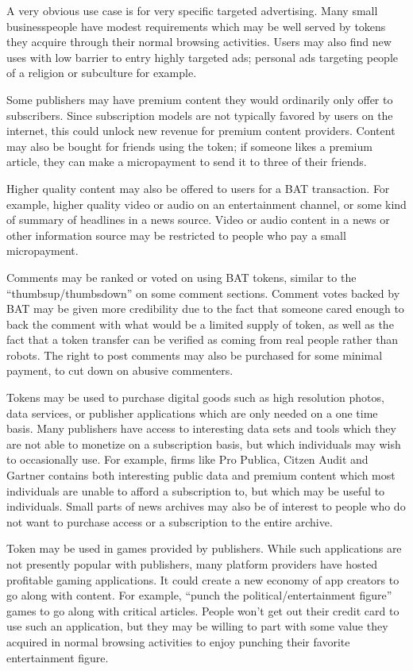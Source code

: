 \documentclass[11pt]{article}
\begin{document}
A very obvious use case is for very specific targeted advertising. Many small businesspeople have modest requirements which may be well served by tokens they acquire through their normal browsing activities. Users may also find new uses with low barrier to entry highly targeted ads; personal ads targeting people of a religion or subculture for example.

Some publishers may have premium content they would ordinarily only offer to subscribers. Since subscription models are not typically favored by users on the internet, this could unlock new revenue for premium content providers. Content may also be bought for friends using the token; if someone likes a premium article, they can make a micropayment to send it to three of their friends.

Higher quality content may also be offered to users for a BAT transaction. For example, higher quality video or audio on an entertainment channel, or some kind of summary of headlines in a news source. Video or audio content in a news or other information source may be restricted to people who pay a small micropayment.

Comments may be ranked or voted on using BAT tokens, similar to the “thumbsup/thumbsdown” on some comment sections. Comment votes backed by BAT may be given more credibility due to the fact that someone cared enough to back the comment with what would be a limited supply of token, as well as the fact that a token transfer can be verified as coming from real people rather than robots. The right to post comments may also be purchased for some minimal payment, to cut down on abusive commenters.

Tokens may be used to purchase digital goods such as high resolution photos, data services, or publisher applications which are only needed on a one time basis. Many publishers have access to interesting data sets and tools which they are not able to monetize on a subscription basis, but which individuals may wish to occasionally use. For example, firms like Pro Publica, Citzen Audit and Gartner contains both interesting public data and premium content which most individuals are unable to afford a subscription to, but which may be useful to individuals. Small parts of news archives may also be of interest to people who do not want to purchase access or a subscription to the entire archive.

Token may be used in games provided by publishers. While such applications are not presently popular with publishers, many platform providers have hosted profitable gaming applications. It could create a new economy of app creators to go along with content. For example, “punch the political/entertainment figure” games to go along with critical articles. People won’t get out their credit card to use such an application, but they may be willing to part with some value they acquired in normal browsing activities to enjoy punching their favorite entertainment figure.
\end{document}
